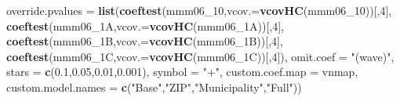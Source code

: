 \documentclass[
]{article}
\newenvironment{Shaded}{\begin{snugshade}}{\end{snugshade}}
\newcommand{\DataTypeTok}[1]{\textcolor[rgb]{0.13,0.29,0.53}{#1}}
\newcommand{\DecValTok}[1]{\textcolor[rgb]{0.00,0.00,0.81}{#1}}
\newcommand{\FloatTok}[1]{\textcolor[rgb]{0.00,0.00,0.81}{#1}}
\newcommand{\KeywordTok}[1]{\textcolor[rgb]{0.13,0.29,0.53}{\textbf{#1}}}
\newcommand{\NormalTok}[1]{#1}
\newcommand{\StringTok}[1]{\textcolor[rgb]{0.31,0.60,0.02}{#1}}
\begin{document}
\begin{Shaded}
\begin{Highlighting}[]
          \DataTypeTok{override.pvalues =} \KeywordTok{list}\NormalTok{(}\KeywordTok{coeftest}\NormalTok{(mmm06_}\DecValTok{10}\NormalTok{,}\DataTypeTok{vcov.=}\KeywordTok{vcovHC}\NormalTok{(mmm06_}\DecValTok{10}\NormalTok{))[,}\DecValTok{4}\NormalTok{],}
                                  \KeywordTok{coeftest}\NormalTok{(mmm06_1A,}\DataTypeTok{vcov.=}\KeywordTok{vcovHC}\NormalTok{(mmm06_1A))[,}\DecValTok{4}\NormalTok{],}
                                  \KeywordTok{coeftest}\NormalTok{(mmm06_1B,}\DataTypeTok{vcov.=}\KeywordTok{vcovHC}\NormalTok{(mmm06_1B))[,}\DecValTok{4}\NormalTok{],}
                                  \KeywordTok{coeftest}\NormalTok{(mmm06_1C,}\DataTypeTok{vcov.=}\KeywordTok{vcovHC}\NormalTok{(mmm06_1C))[,}\DecValTok{4}\NormalTok{]),}
          \DataTypeTok{omit.coef =} \StringTok{"(wave)"}\NormalTok{, }\DataTypeTok{stars =} \KeywordTok{c}\NormalTok{(}\FloatTok{0.1}\NormalTok{,}\FloatTok{0.05}\NormalTok{,}\FloatTok{0.01}\NormalTok{,}\FloatTok{0.001}\NormalTok{), }\DataTypeTok{symbol =} \StringTok{"+"}\NormalTok{,}
          \DataTypeTok{custom.coef.map =}\NormalTok{ vnmap, }
          \DataTypeTok{custom.model.names =} \KeywordTok{c}\NormalTok{(}\StringTok{"Base"}\NormalTok{,}\StringTok{"ZIP"}\NormalTok{,}\StringTok{"Municipality"}\NormalTok{,}\StringTok{"Full"}\NormalTok{))}
\end{Highlighting}
\end{Shaded}
\end{document}
